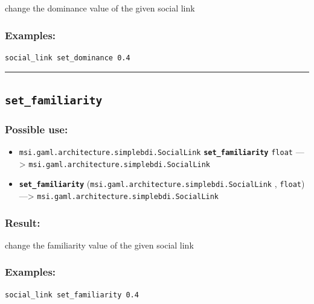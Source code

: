 \documentclass[]{book}
\providecommand{\tightlist}{%
  \setlength{\itemsep}{0pt}\setlength{\parskip}{0pt}}
\theoremstyle{definition}
\theoremstyle{definition}
\theoremstyle{definition}
\theoremstyle{remark}
\begin{document}
change the dominance value of the given social link

\subsubsection{Examples:}\label{examples-315}

\begin{verbatim}
social_link set_dominance 0.4 
\end{verbatim}

\begin{center}\rule{0.5\linewidth}{\linethickness}\end{center}

\subsection{\texorpdfstring{\texttt{set\_familiarity}}{set\_familiarity}}\label{set_familiarity}

\subsubsection{Possible use:}\label{possible-use-459}

\begin{itemize}
\tightlist
\item
  \texttt{msi.gaml.architecture.simplebdi.SocialLink}
  \textbf{\texttt{set\_familiarity}} \texttt{float} ---\textgreater{}
  \texttt{msi.gaml.architecture.simplebdi.SocialLink}
\item
  \textbf{\texttt{set\_familiarity}}
  (\texttt{msi.gaml.architecture.simplebdi.SocialLink} , \texttt{float})
  ---\textgreater{} \texttt{msi.gaml.architecture.simplebdi.SocialLink}
\end{itemize}

\subsubsection{Result:}\label{result-443}

change the familiarity value of the given social link

\subsubsection{Examples:}\label{examples-316}

\begin{verbatim}
social_link set_familiarity 0.4 
\end{verbatim}
\end{document}
